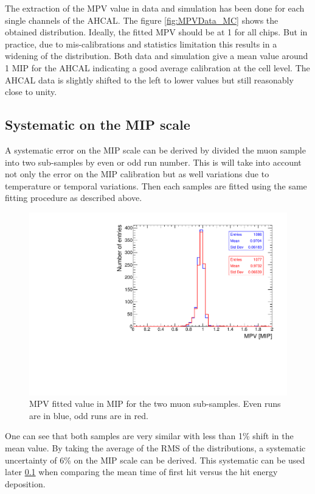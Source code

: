The extraction of the MPV value in data and simulation has been done for each single channels of the AHCAL. The figure \ref{fig:MPVData_MC} shows the obtained distribution. Ideally, the fitted MPV should be at 1 for all chips. But in practice, due to mis-calibrations and statistics limitation this results in a widening of the distribution. Both data and simulation give a mean value around 1 MIP for the AHCAL indicating a good average calibration at the cell level. The AHCAL data is slightly shifted to the left to lower values but still reasonably close to unity.

\subsection{Systematic on the MIP scale}

A systematic error on the MIP scale can be derived by divided the muon sample into two sub-samples by even or odd run number. This is will take into account not only the error on the MIP calibration but as well variations due to temperature or temporal variations. Then each samples are fitted using the same fitting procedure as described above.

\begin{figure}[htbp!]
	\centering
	\includegraphics[width=0.7\linewidth]{../Thesis_Plots/EnergyCalib/Plots/SystematicMIP.pdf}
	\caption{MPV fitted value in MIP for the two muon sub-samples. Even runs are in blue, odd runs are in red.} \label{fig:MIPSyst}
\end{figure}

One can see that both samples are very similar with less than 1\% shift in the mean value. By taking the average of the RMS of the distributions, a systematic uncertainty of 6\% on the MIP scale can be derived. This systematic can be used later \ref{} when comparing the mean time of first hit versus the hit energy deposition.


